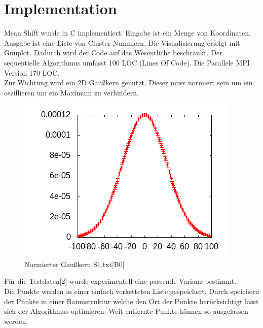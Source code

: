 \section{Implementation}
	Mean Shift wurde in C implementiert. 
	Eingabe ist ein Menge von Koordinaten. Ausgabe ist eine Liste von Cluster Nummern. Die Visualisierung erfolgt mit Gnuplot.
	Dadurch wird der Code auf das Wesentliche beschränkt.
	Der sequentielle Algorithmus umfasst 100 LOC (Lines Of Code). Die Parallele MPI Version 170 LOC.\\
	Zur Wichtung wird ein 2D Gaußkern genutzt. Dieser muss normiert sein um ein oszillieren um ein Maximum zu verhindern.\\
	\vspace{-10pt}
	\begin{figure}[H]
		\centering
		\includegraphics[scale=0.7]{../meanshift/output/pics/gauss.png} 
		\caption{Normierter Gaußkern S1.txt[B0]}
	\end{figure}
	Für die Testdaten[2] wurde experimentell eine passende Varianz bestimmt.\\
	Die Punkte werden in einer einfach verketteten Liste gespeichert. Durch speichern der Punkte in einer Baumstruktur welche den Ort der
	Punkte berücksichtigt lässt sich der Algorithmus optimieren. Weit entfernte Punkte können so ausgelassen werden.\\
